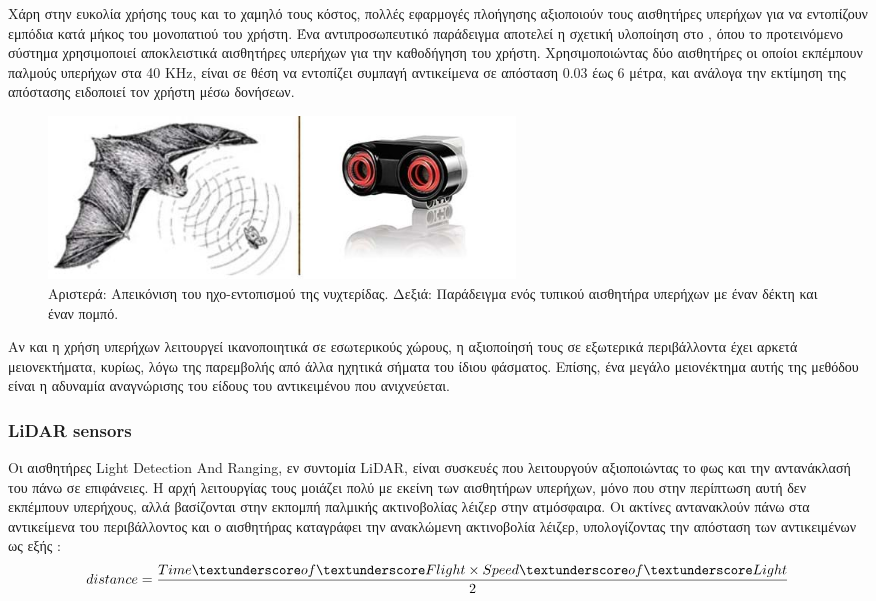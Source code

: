 Χάρη στην ευκολία χρήσης τους και το χαμηλό τους κόστος, πολλές εφαρμογές πλοήγησης αξιοποιούν τους αισθητήρες υπερήχων για να εντοπίζουν εμπόδια κατά μήκος του μονοπατιού του χρήστη. Ένα αντιπροσωπευτικό παράδειγμα αποτελεί η σχετική υλοποίηση στο \cite{bousbia2007ultrasonic}, όπου το προτεινόμενο σύστημα χρησιμοποιεί αποκλειστικά αισθητήρες υπερήχων για την καθοδήγηση του χρήστη. Χρησιμοποιώντας δύο αισθητήρες οι οποίοι εκπέμπουν παλμούς υπερήχων στα 40 KHz, είναι σε θέση να εντοπίζει συμπαγή αντικείμενα σε απόσταση 0.03 έως 6 μέτρα, και ανάλογα την εκτίμηση της απόστασης ειδοποιεί τον χρήστη μέσω δονήσεων.

\begin{figure}[H]
    \centering
    \includegraphics[width=0.6\textwidth]{images/ultrasonic_example.jpg}
    \caption{Αριστερά: Απεικόνιση του ηχο-εντοπισμού της νυχτερίδας. Δεξιά: Παράδειγμα ενός τυπικού αισθητήρα υπερήχων με έναν δέκτη και έναν πομπό.}
    \label{fig:sonar-example}
\end{figure}
\hspace{1cm}
Αν και η χρήση υπερήχων λειτουργεί ικανοποιητικά σε εσωτερικούς χώρους, η αξιοποίησή τους σε εξωτερικά περιβάλλοντα έχει αρκετά μειονεκτήματα, κυρίως, λόγω της παρεμβολής από άλλα ηχητικά σήματα του ίδιου φάσματος. Επίσης, ένα μεγάλο μειονέκτημα αυτής της μεθόδου είναι η αδυναμία αναγνώρισης του είδους του αντικειμένου που ανιχνεύεται.

\subsubsection{LiDAR sensors}
Οι αισθητήρες Light Detection And Ranging, εν συντομία LiDAR, είναι συσκευές που λειτουργούν αξιοποιώντας το φως και την αντανάκλασή του πάνω σε επιφάνειες. Η αρχή λειτουργίας τους μοιάζει πολύ με εκείνη των αισθητήρων υπερήχων, μόνο που στην περίπτωση αυτή δεν εκπέμπουν υπερήχους, αλλά βασίζονται στην εκπομπή παλμικής ακτινοβολίας λέιζερ στην ατμόσφαιρα. Οι ακτίνες αντανακλούν πάνω στα αντικείμενα του περιβάλλοντος και ο αισθητήρας καταγράφει την ανακλώμενη ακτινοβολία λέιζερ, υπολογίζοντας την απόσταση των αντικειμένων ως εξής \cite{wwwlidar41:online}: \[distance = \frac{Time\textunderscore of\textunderscore Flight \times Speed\textunderscore of\textunderscore Light}{2}\]

